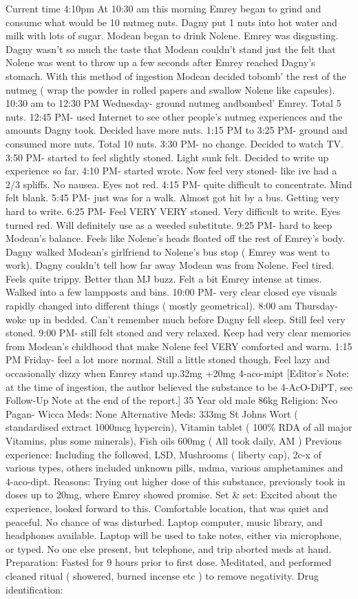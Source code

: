 \documentclass[12pt]{book}
\begin{document}
Current time 4:10pm At 10:30 am this morning Emrey began to grind and consume what would be 10 nutmeg nuts. Dagny put 1  nuts into hot water and milk with lots of sugar. Modean began to drink Nolene. Emrey was disgusting. Dagny wasn't so much the taste that Modean couldn't stand just the felt that Nolene was went to throw up a few seconds after Emrey reached Dagny's stomach. With this method of ingestion Modean decided tobomb' the rest of the nutmeg ( wrap the powder in rolled papers and swallow Nolene like capsules). 10:30 am to 12:30 PM Wednesday- ground nutmeg andbombed' Emrey. Total 5 nuts. 12:45 PM- used Internet to see other people's nutmeg experiences and the amounts Dagny took. Decided have more nuts. 1:15 PM to 3:25 PM- ground and consumed more nuts. Total 10 nuts. 3:30 PM- no change. Decided to watch TV. 3:50 PM- started to feel slightly stoned. Light sunk felt. Decided to write up experience so far. 4:10 PM- started wrote. Now feel very stoned- like ive had a 2/3 spliffs. No nausea. Eyes not red. 4:15 PM- quite difficult to concentrate. Mind felt blank. 5:45 PM- just was for a walk. Almost got hit by a bus. Getting very hard to write. 6:25 PM- Feel VERY VERY stoned. Very difficult to write. Eyes turned red. Will definitely use as a weeded substitute. 9:25 PM- hard to keep Modean's balance. Feels like Nolene's heads floated off the rest of Emrey's body. Dagny walked Modean's girlfriend to Nolene's bus stop ( Emrey was went to work). Dagny couldn't tell how far away Modean was from Nolene. Feel tired. Feels quite trippy. Better than MJ buzz. Felt a bit Emrey intense at times. Walked into a few lampposts and bins. 10:00 PM- very clear closed eye visuals rapidly changed into different things ( mostly geometrical). 8:00 am Thursday- woke up in bedded. Can't remember much before Dagny fell sleep. Still feel very stoned. 9:00 PM- still felt stoned and very relaxed. Keep had very clear memories from Modean's childhood that make Nolene feel VERY comforted and warm. 1:15 PM Friday- feel a lot more normal. Still a little stoned though. Feel lazy and occasionally dizzy when Emrey stand up.32mg +20mg 4-aco-mipt [Editor's Note: at the time of ingestion, the author believed the substance to be 4-AcO-DiPT, see Follow-Up Note at the end of the report.] 35 Year old male 86kg Religion: Neo Pagan- Wicca Meds: None Alternative Meds: 333mg St Johns Wort ( standardised extract 1000mcg hypercin), Vitamin tablet ( 100\% RDA of all major Vitamins, plus some minerals), Fish oils 600mg ( All took daily, AM ) Previous experience: Including the followed, LSD, Mushrooms ( liberty cap), 2c-x of various types, others included unknown pills, mdma, various amphetamines and 4-aco-dipt. Reasons: Trying out higher dose of this substance, previously took in doses up to 20mg, where Emrey showed promise. Set \& set: Excited about the experience, looked forward to this. Comfortable location, that was quiet and peaceful. No chance of was disturbed. Laptop computer, music library, and headphones available. Laptop will be used to take notes, either via microphone, or typed. No one else present, but telephone, and trip aborted meds at hand. Preparation: Fasted for 9 hours prior to first dose. Meditated, and performed cleaned ritual ( showered, burned incense etc ) to remove negativity. Drug identification: 
\end{document}
